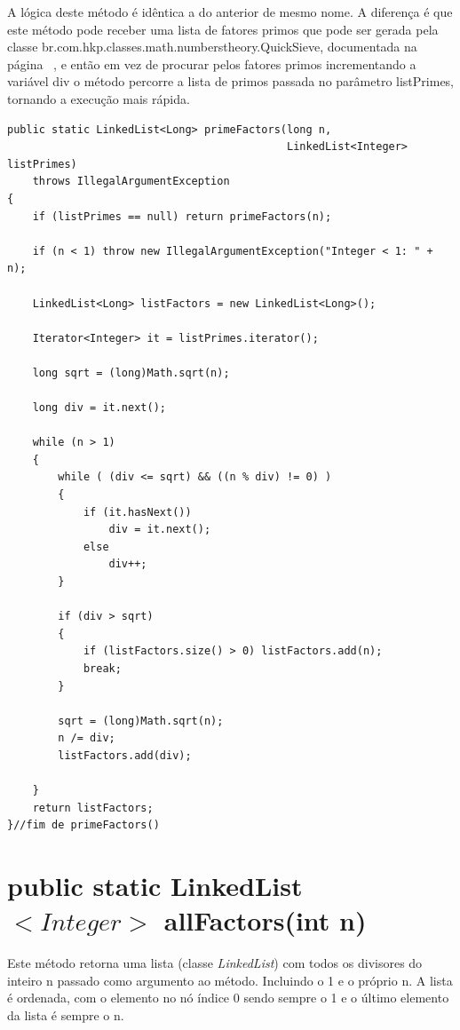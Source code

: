 \documentclass[a4paper,12pt,openany]{book}
\begin{document}
A lógica deste método é idêntica a do anterior de mesmo nome. A diferença é que este método pode receber uma lista de fatores primos que pode ser gerada pela classe br.com.hkp.classes.math.numberstheory.QuickSieve, documentada na página ~\pageref{classe:QuickSieve}, e então em vez de procurar pelos fatores primos incrementando a variável div o método percorre a lista de primos passada no parâmetro listPrimes, tornando a execução mais rápida.

\begin{lstlisting}
public static LinkedList<Long> primeFactors(long n, 
											LinkedList<Integer> listPrimes)
	throws IllegalArgumentException
{
	if (listPrimes == null) return primeFactors(n);
	
	if (n < 1) throw new IllegalArgumentException("Integer < 1: " + n);
	
	LinkedList<Long> listFactors = new LinkedList<Long>();
	
	Iterator<Integer> it = listPrimes.iterator();
	
	long sqrt = (long)Math.sqrt(n);
	
	long div = it.next();
	
	while (n > 1) 
	{
		while ( (div <= sqrt) && ((n % div) != 0) )
		{
			if (it.hasNext()) 
				div = it.next();
			else
				div++;
		}
		
		if (div > sqrt)
		{ 
			if (listFactors.size() > 0) listFactors.add(n);
			break;
		}
		
		sqrt = (long)Math.sqrt(n);
		n /= div; 
		listFactors.add(div);
	
	}
	return listFactors;
}//fim de primeFactors()
\end{lstlisting} 

\section*{public static LinkedList $<Integer>$ allFactors(int n)}

Este método retorna uma lista (classe \textit{LinkedList}) com todos os divisores do inteiro n passado como argumento ao método. Incluindo o 1 e o próprio n. A lista é ordenada, com o elemento no nó índice 0 sendo sempre o 1 e o último elemento da lista é sempre o n.
\end{document}
